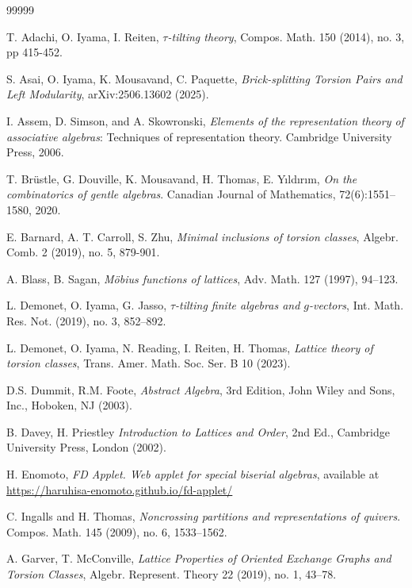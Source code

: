 \documentclass{amsart}
\theoremstyle{thmstyle}
\theoremstyle{exstyle}
\theoremstyle{defstyle}
\theoremstyle{remstyle}
\theoremstyle{remstyle}
\begin{document}
\begin{thebibliography}{99999}
    
     T. Adachi, O. Iyama, I. Reiten, 
\emph{$\tau$-tilting theory}, Compos. Math. 150 (2014), no. 3, pp 415-452.

     S. Asai, O. Iyama, K. Mousavand, C. Paquette,
\emph{Brick-splitting Torsion Pairs and Left Modularity}, arXiv:2506.13602 (2025).

     I. Assem, D. Simson, and A. Skowronski, 
\emph{Elements of the representation theory of associative
algebras}: Techniques of representation theory. Cambridge University Press, 2006.

 T. Br\"ustle, G. Douville, K. Mousavand, H. Thomas, E. Yıldırım,
\emph{On the combinatorics of gentle algebras}. Canadian Journal of Mathematics, 72(6):1551–1580, 2020.

     E. Barnard, A. T. Carroll, S. Zhu, 
\emph{Minimal inclusions of torsion classes}, Algebr. Comb.
2 (2019), no. 5, 879-901.

     A. Blass, B. Sagan,
\emph{Möbius functions of lattices}, Adv. Math. 127 (1997), 94–123.

      L. Demonet, O. Iyama, G. Jasso,
\emph{$\tau$-tilting finite algebras and $g$-vectors},  Int. Math. Res. Not. (2019), no. 3, 852–892.

     L. Demonet, O. Iyama, N. Reading, I. Reiten, H. Thomas, 
\emph{Lattice theory of torsion classes}, Trans. Amer. Math. Soc. Ser. B 10 (2023).

     D.S. Dummit, R.M. Foote,
\emph{Abstract Algebra}, 3rd Edition, John Wiley and Sons, Inc., Hoboken, NJ (2003).

     B. Davey, H. Priestley
\emph{Introduction to Lattices and Order}, 2nd Ed., Cambridge University Press, London (2002).

     H. Enomoto, 
\emph{FD Applet. Web applet for special biserial algebras}, available at \url{https://haruhisa-enomoto.github.io/fd-applet/}

     C. Ingalls and H. Thomas,
\emph{Noncrossing partitions and representations of quivers}. Compos. Math. 145 (2009), no. 6, 1533–1562.

     A. Garver, T. McConville, 
\emph{Lattice Properties of Oriented Exchange Graphs and Torsion Classes}, Algebr. Represent. Theory 22 (2019), no. 1, 43–78.


\end{thebibliography}
\end{document}
